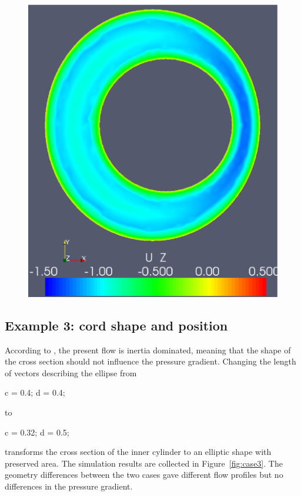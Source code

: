 \begin{figure}
{            \includegraphics[width=\threefigsfull]{chapters/hentschel/pdf/sin_diamin_nmb6.pdf}}
\end{figure}

\subsection{Example 3: cord shape and position}

According to \citet{LothYardimciAlperin2001,AlperinMazdaLichtorEtAl2006},
the present flow is inertia dominated, meaning that the shape of the
cross section should not influence the pressure gradient. Changing the
length of vectors describing the ellipse from
\begin{anycode}
c = 0.4;
d = 0.4;
\end{anycode}
to
\begin{anycode}
c = 0.32;
d = 0.5;
\end{anycode}
transforms the cross section of the inner cylinder to an elliptic
shape with preserved area. The simulation results are collected in
Figure~\ref{fig:case3}. The geometry differences between the two cases
gave different flow profiles but no differences in the pressure
gradient.

